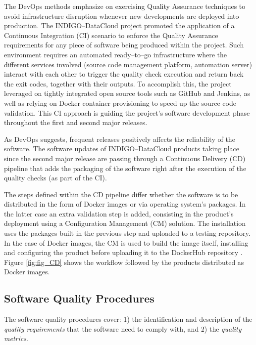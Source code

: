 \documentclass[journal]{IEEEtran}
\begin{document}
The DevOps methods emphasize on exercising Quality Assurance techniques to
avoid infrastructure disruption whenever new developments are deployed into
production. The INDIGO--DataCloud project promoted the application of a Continuous Integration (CI)
scenario to enforce the Quality Assurance requirements for any piece of
software being produced within the project. Such environment requires an
automated ready--to--go infrastructure where the different services involved
(source code management platform, automation server) interact with each other
to trigger the quality check execution and return back the exit codes, together
with their outputs. To accomplish this, the project leveraged on tightly
integrated open source tools such as GitHub and Jenkins, as well as relying on
Docker container provisioning to speed up the source code validation. This CI
approach is guiding the project’s software development phase throughout the
first and second major releases.

As DevOps suggests, frequent releases positively affects the reliability of the
software. The software updates of INDIGO--DataCloud products taking place since
the second major release are passing through a Continuous Delivery (CD)
pipeline that adds the packaging of the software right after the execution of
the quality checks (as part of the CI).

The steps defined within the CD
pipeline differ whether the software is to be distributed in the form of Docker
images or via operating system’s packages. In the latter case an extra
validation step is added, consisting in the product’s deployment using a
Configuration Management (CM) solution. The installation uses the packages
built in the previous step and uploaded to a testing
repository. In the case of Docker images, the CM is used to build the image
itself, installing and configuring the product before uploading it to the
DockerHub repository \cite{indigo-dockerhub}. Figure \ref{fig:fig_CD} shows
the workflow followed by the products distributed as Docker images.

\subsection{Software Quality Procedures}

The software quality procedures \cite{indigo-d31} cover: 1) the identification
and description of the \emph{quality requirements} that the software need to
comply with, and 2) the \emph{quality metrics}.
\end{document}
